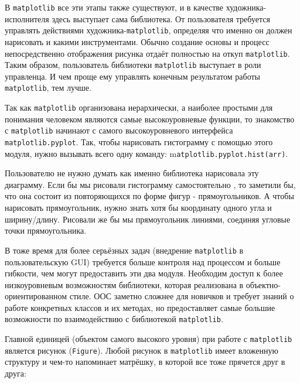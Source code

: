 В \lstinline!matplotlib! все эти этапы также существуют, и в качестве художника-исполнителя здесь выступает сама библиотека. От пользователя требуется управлять действиями художника-\lstinline!matplotlib!, определяя что именно он должен нарисовать и какими инструментами. Обычно создание основы и процесс непосредственно отображения рисунка отдаёт полностью на откуп \lstinline!matplotlib!. Таким образом, пользователь библиотеки \lstinline!matplotlib! выступает в роли управленца. И чем проще ему управлять конечным результатом работы \lstinline!matplotlib!, тем лучше.

Так как \lstinline!matplotlib! организована иерархически, а наиболее простыми для понимания человеком являются самые высокоуровневые функции, то знакомство с \lstinline!matplotlib! начинают с самого высокоуровневого интерфейса \lstinline!matplotlib.pyplot!. Так, чтобы нарисовать гистограмму с помощью этого модуля, нужно вызывать всего одну команду: m\lstinline!atplotlib.pyplot.hist(arr)!.

Пользователю не нужно думать как именно библиотека нарисовала эту диаграмму. Если бы мы рисовали гистограмму самостоятельно , то заметили бы, что она состоит из повторяющихся по форме фигур - прямоугольников. А чтобы нарисовать прямоугольник, нужно знать хотя бы координату одного угла и ширину/длину. Рисовали же бы мы прямоугольник линиями, соединяя угловые точки прямоугольника.

В тоже время для более серьёзных задач (внедрение \lstinline!matplotlib! в пользовательскую GUI) требуется больше контроля над процессом и больше гибкости, чем могут предоставить эти два модуля. Необходим доступ к более низкоуровневым возможностям библиотеки, которая реализована в объектно-ориентированном стиле. ООС заметно сложнее для новичков и требует знаний о работе конкретных классов и их методах, но предоставляет самые большие возможности по взаимодействию с библиотекой \lstinline!matplotlib!.

Главной единицей (объектом самого высокого уровня) при работе с \lstinline!matplotlib! является рисунок (\lstinline!Figure!). Любой рисунок в \lstinline!matplotlib! имеет вложенную структуру и чем-то напоминает матрёшку, в которой все тоже прячется друг в друга:

